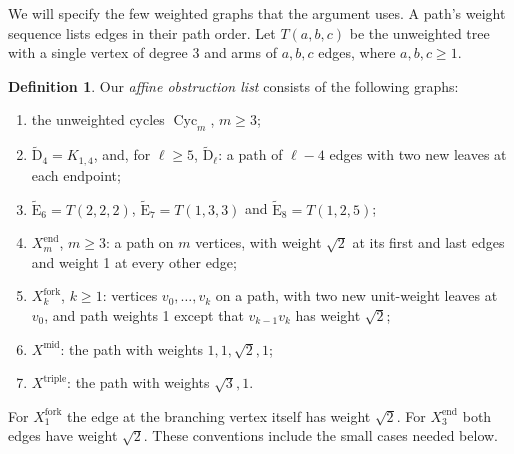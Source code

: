 \documentclass[11pt]{amsart}
\newcommand\opk[1]{\mathop{\mathrm{#1}}\nolimits}
\theoremstyle{definition}
\newtheorem{definition}[theorem]{Definition}
\newcommand{\typ}[1]{\mathrm{#1}}
\newcommand{\Cyc}{\opk{Cyc}}
\begin{document}
We will specify the few weighted graphs that the argument uses. A path's
weight sequence lists edges in their path order. Let $T(a,b,c)$ be the
unweighted tree with a single vertex of degree 3 and arms of $a,b,c$ edges,
where $a,b,c\geq1$.
\begin{definition}\label{def:affine}
Our \emph{affine obstruction list} consists of the following graphs:
\begin{enumerate}
\item the unweighted cycles $\Cyc_m$, $m\geq3$;
\item $\widetilde{\typ D}_4=K_{1,4}$, and, for $\ell\geq5$,
 $\widetilde{\typ D}_\ell$: a path of $\ell-4$ edges with two new
 leaves at each endpoint;
\item $\widetilde{\typ E}_6=T(2,2,2)$,
 $\widetilde{\typ E}_7=T(1,3,3)$ and
 $\widetilde{\typ E}_8=T(1,2,5)$;
\item $X^{\mathrm{end}}_m$, $m\geq3$: a path on $m$ vertices, with weight $\sqrt2$
 at its first and last edges and weight 1 at every other edge;
\item $X^{\mathrm{fork}}_k$, $k\geq1$: vertices $v_0,\ldots,v_k$ on a path, with
 two new unit-weight leaves at $v_0$, and path weights 1 except that
 $v_{k-1}v_k$ has weight $\sqrt2$;
\item $X^{\mathrm{mid}}$: the path with weights $1,1,\sqrt2,1$;
\item $X^{\mathrm{triple}}$: the path with weights $\sqrt3,1$.
\end{enumerate}
For $X^{\mathrm{fork}}_1$ the edge at the branching vertex itself has weight $\sqrt2$.
For $X^{\mathrm{end}}_3$ both edges have weight $\sqrt2$. These conventions include the
small cases needed below.
\end{definition}
\end{document}

